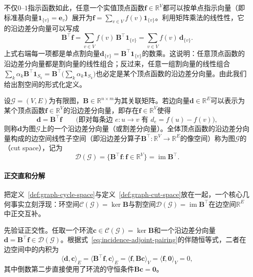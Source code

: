 不仅$0$--$1$指示函数如此，任意一个实值顶点函数$\bm{f}\in\mathbb{R}^V$都可以按单点指示向量（即标准基向量$\bm{1}_{\{v\}}=\bm{e}_v$）展开为$\bm{f}=\sum_{v\in V}f(v)\bm{1}_{\{v\}}$。利用矩阵乘法的线性性，它的沿边差分向量可以写成
\[
\bm{B}^\top\bm{f}
=\sum_{v\in V}f(v)\,\bm{B}^\top\bm{1}_{\{v\}}
=\sum_{v\in V}f(v)\,\bm{d}_{\{v\}}.
\]
上式右端每一项都是单点割向量$\bm{d}_{\{v\}}=\bm{B}^\top\bm{1}_{\{v\}}$的数乘。这说明：任意顶点函数的沿边差分向量都是割向量的线性组合；反过来，任意一组割向量的线性组合$\sum_k\alpha_k\bm{B}^\top\bm{1}_{S_k}=\bm{B}^\top\bigl(\sum_k\alpha_k\bm{1}_{S_k}\bigr)$也必定是某个顶点函数的沿边差分向量。由此我们给出割空间的形式化定义。

\begin{definition}[割空间]
\label{def:graph-cut-space}
设$\mathcal{G}=(V,E)$为有限图，$\bm{B}\in\mathbb{R}^{n\times m}$为其关联矩阵。若边向量$\bm{d}\in\mathbb{R}^E$可以表示为某个顶点函数$\bm{f}\in\mathbb{R}^V$的沿边差分向量，即存在$\bm{f}\in\mathbb{R}^V$使得
\[
\bm{d}=\bm{B}^\top\bm{f}\qquad\bigl(\text{即对每条边 }e\colon u\to v\text{ 有 }d_e=f(u)-f(v)\bigr),
\]
则称$\bm{d}$为图$\mathcal{G}$上的一个沿边差分向量（或割差分向量）。全体顶点函数的沿边差分向量构成的边空间线性子空间（即沿边差分算子$\bm{B}^\top\colon\mathbb{R}^V\to\mathbb{R}^E$的像空间）称为图$\mathcal{G}$的（cut space），记为
\begin{equation}
\mathcal{D}(\mathcal{G})=\{\bm{B}^\top\bm{f}:\bm{f}\in\mathbb{R}^V\}=\operatorname{im}\bm{B}^\top.
\label{eq:incidence-cut-space}
\end{equation}
\end{definition}

\paragraph{正交直和分解}

把定义~\ref{def:graph-cycle-space}与定义~\ref{def:graph-cut-space}放在一起，一个核心几何事实立刻浮现：环空间$\mathcal{C}(\mathcal{G})=\ker\bm{B}$与割空间$\mathcal{D}(\mathcal{G})=\operatorname{im}\bm{B}^\top$在边空间$\mathbb{R}^E$中正交互补。

先验证正交性。任取一个环流$\bm{c}\in\mathcal{C}(\mathcal{G})=\ker\bm{B}$和一个沿边差分向量$\bm{d}=\bm{B}^\top\bm{f}\in\mathcal{D}(\mathcal{G})$。根据式~\eqref{eq:incidence-adjoint-pairing}的伴随恒等式，二者在边空间中的内积为
\[
\langle\bm{d},\bm{c}\rangle_E
=\langle\bm{B}^\top\bm{f},\bm{c}\rangle_E
=\langle\bm{f},\bm{B}\bm{c}\rangle_V
=\langle\bm{f},\bm{0}\rangle_V=0,
\]
其中倒数第二步直接使用了环流的守恒条件$\bm{B}\bm{c}=\bm{0}$。

